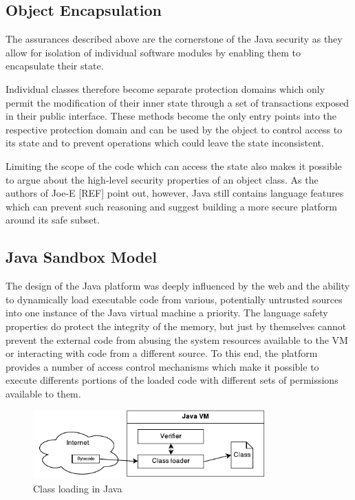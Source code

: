 \documentclass[a4paper,12pt,twoside,openright]{report}
\begin{document}
\subsection{Object Encapsulation}

The assurances described above are the cornerstone of the Java security as they allow for isolation of individual software modules by enabling them to encapsulate their state. 

Individual classes therefore become separate protection domains which only permit the modification of their inner state through a set of transactions exposed in their public interface. These methods become the only entry points into the respective protection domain and can be used by the object to control access to its state and to prevent operations which could leave the state inconsistent.

Limiting the scope of the code which can access the state also makes it possible to argue about the high-level security properties of an object class. As the authors of Joe-E [REF] point out, however, Java still contains language features which can prevent such reasoning and suggest building a more secure platform around its safe subset.

\subsection{Java Sandbox Model}

The design of the Java platform was deeply influenced by the web and the ability to dynamically load executable code from various, potentially untrusted sources into one instance of the Java virtual machine a priority. The language safety properties do protect the integrity of the memory, but just by themselves cannot prevent the external code from abusing the system resources available to the VM or interacting with code from a different source. To this end, the platform provides a number of access control mechanisms which make it possible to execute differents portions of the loaded code with different sets of permissions available to them. 

\begin{figure}
	\centering
	\includegraphics[width=0.8\textwidth]{dia_java_classload.pdf}
	\caption{Class loading in Java}
\end{figure}
\end{document}
